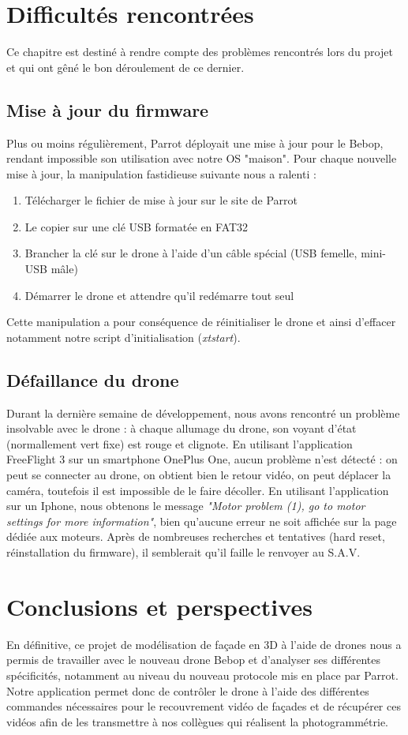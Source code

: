 \documentclass[12pt, openany]{report}
\begin{document}
\chapter{Difficultés rencontrées}
Ce chapitre est destiné à rendre compte des problèmes rencontrés lors du projet et qui ont gêné le bon déroulement de ce dernier.

\section{Mise à jour du firmware}
Plus ou moins régulièrement, Parrot déployait une mise à jour pour le Bebop, rendant impossible son utilisation avec notre OS "maison". Pour chaque nouvelle mise à jour, la manipulation fastidieuse suivante nous a ralenti :
\begin{enumerate}
\item Télécharger le fichier de mise à jour sur le site de Parrot
\item Le copier sur une clé USB formatée en FAT32
\item Brancher la clé sur le drone à l'aide d'un câble spécial (USB femelle, mini-USB mâle)
\item Démarrer le drone et attendre qu'il redémarre tout seul
\end{enumerate}
Cette manipulation a pour conséquence de réinitialiser le drone et ainsi d'effacer notamment notre script d'initialisation (\textit{xtstart}).


\section{Défaillance du drone}
Durant la dernière semaine de développement, nous avons rencontré un problème insolvable avec le drone : à chaque allumage du drone, son voyant d'état (normallement vert fixe) est rouge et clignote. En utilisant l'application FreeFlight 3 sur un smartphone OnePlus One, aucun problème n'est détecté : on peut se connecter au drone, on obtient bien le retour vidéo, on peut déplacer la caméra, toutefois il est impossible de le faire décoller. En utilisant l'application sur un Iphone, nous obtenons le message \textit{"Motor problem (1), go to motor settings for more information"}, bien qu'aucune erreur ne soit affichée sur la page dédiée aux moteurs. 
Après de nombreuses recherches et tentatives (hard reset, réinstallation du firmware), il semblerait qu'il faille le renvoyer au S.A.V.


\chapter{Conclusions et perspectives}
En définitive, ce projet de modélisation de façade en 3D à l'aide de drones nous a permis de travailler avec le nouveau drone Bebop et d'analyser ses différentes spécificités, notamment au niveau du nouveau protocole mis en place par Parrot. Notre application permet donc de contrôler le drone à l'aide des différentes commandes nécessaires pour le recouvrement vidéo de façades et de récupérer ces vidéos afin de les transmettre à nos collègues qui réalisent la photogrammétrie.
\end{document}
